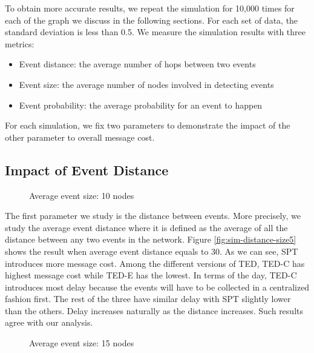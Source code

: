 To obtain more accurate results, we repeat the simulation for 10,000 times for each of the graph we discuss in the following sections. For each set of data, the standard deviation is less than 0.5. We measure the simulation results with three metrics:
\begin{itemize}
\item Event distance: the average number of hops between two events
\item Event size: the average number of nodes involved in detecting events
\item Event probability: the average probability for an event to happen
\end{itemize}

For each simulation, we fix two parameters to demonstrate the impact of the other parameter to overall message cost. 

\subsection{Impact of Event Distance}

\begin{figure}
\centering
{}
\caption{Average event size: 10 nodes}
\label{fig:sim-distance-size10}
\end{figure}

The first parameter we study is the distance between events. More precisely, we study the average event distance where it is defined as the average of all the distance between any two events in the network. Figure \ref{fig:sim-distance-size5} shows the result when average event distance equals to 30. As we can see, SPT introduces more message cost. Among the different versions of TED, TED-C has highest message cost while TED-E has the lowest. In terms of the day, TED-C introduces most delay because the events will have to be collected in a centralized fashion first. The rest of the three have similar delay with SPT slightly lower than the others. Delay increases naturally as the distance increases. Such results agree with our analysis.

\begin{figure}
\centering
{}
\caption{Average event size: 15 nodes}
\label{fig:sim-distance-size15}
\end{figure}


